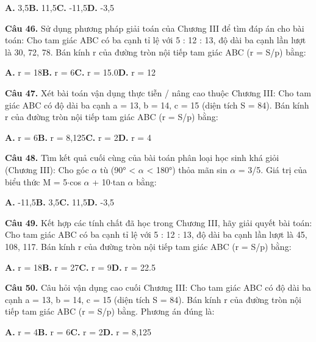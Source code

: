 \documentclass[11pt,a4paper]{article}
\begin{document}
\hspace*{1.5em}\textbf{A.} 3,5\quad\quad \textbf{B.} 11,5\quad\quad \textbf{C.} -11,5\quad\quad \textbf{D.} -3,5\par\vspace{2pt}
\textbf{\color{primary} Câu 46.} Sử dụng phương pháp giải toán của Chương III để tìm đáp án cho bài toán: Cho tam giác ABC có ba cạnh tỉ lệ với 5 : 12 : 13, độ dài ba cạnh lần lượt là 30, 72, 78. Bán kính r của đường tròn nội tiếp tam giác ABC (r = S/p) bằng:\par
\hspace*{1.5em}\textbf{A.} r = 18\quad\quad \textbf{B.} r = 6\quad\quad \textbf{C.} r = 15.0\quad\quad \textbf{D.} r = 12\par\vspace{2pt}
\textbf{\color{primary} Câu 47.} Xét bài toán vận dụng thực tiễn / nâng cao thuộc Chương III: Cho tam giác ABC có độ dài ba cạnh a = 13, b = 14, c = 15 (diện tích S = 84). Bán kính r của đường tròn nội tiếp tam giác ABC (r = S/p) bằng:\par
\hspace*{1.5em}\textbf{A.} r = 6\quad\quad \textbf{B.} r = 8,125\quad\quad \textbf{C.} r = 2\quad\quad \textbf{D.} r = 4\par\vspace{2pt}
\textbf{\color{primary} Câu 48.} Tìm kết quả cuối cùng của bài toán phân loại học sinh khá giỏi (Chương III): Cho góc $\alpha$ tù (90° < $\alpha$ < 180°) thỏa mãn sin $\alpha$ = 3/5. Giá trị của biểu thức M = 5$\cdot$cos $\alpha$ + 10$\cdot$tan $\alpha$ bằng:\par
\hspace*{1.5em}\textbf{A.} -11,5\quad\quad \textbf{B.} 3,5\quad\quad \textbf{C.} 11,5\quad\quad \textbf{D.} -3,5\par\vspace{2pt}
\textbf{\color{primary} Câu 49.} Kết hợp các tính chất đã học trong Chương III, hãy giải quyết bài toán: Cho tam giác ABC có ba cạnh tỉ lệ với 5 : 12 : 13, độ dài ba cạnh lần lượt là 45, 108, 117. Bán kính r của đường tròn nội tiếp tam giác ABC (r = S/p) bằng:\par
\hspace*{1.5em}\textbf{A.} r = 18\quad\quad \textbf{B.} r = 27\quad\quad \textbf{C.} r = 9\quad\quad \textbf{D.} r = 22.5\par\vspace{2pt}
\textbf{\color{primary} Câu 50.} Câu hỏi vận dụng cao cuối Chương III: Cho tam giác ABC có độ dài ba cạnh a = 13, b = 14, c = 15 (diện tích S = 84). Bán kính r của đường tròn nội tiếp tam giác ABC (r = S/p) bằng. Phương án đúng là:\par
\hspace*{1.5em}\textbf{A.} r = 4\quad\quad \textbf{B.} r = 6\quad\quad \textbf{C.} r = 2\quad\quad \textbf{D.} r = 8,125\par\vspace{2pt}
\end{document}
